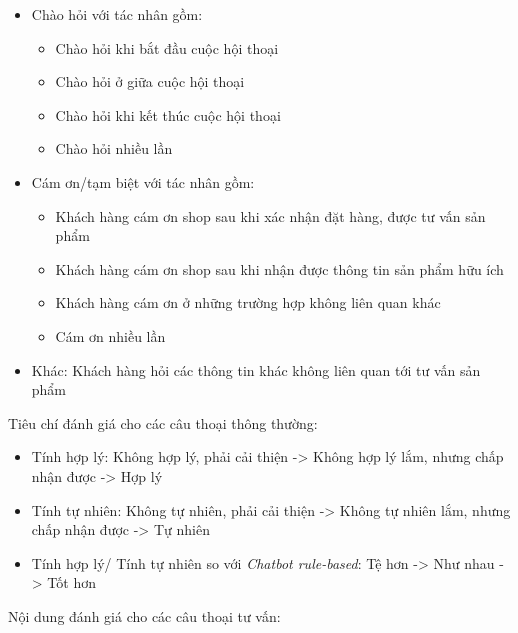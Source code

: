 \begin{itemize}
    \item Chào hỏi với tác nhân gồm:
    \begin{itemize}
        \item Chào hỏi khi bắt đầu cuộc hội thoại
        \item Chào hỏi ở giữa cuộc hội thoại
        \item Chào hỏi khi kết thúc cuộc hội thoại
        \item Chào hỏi nhiều lần
    \end{itemize}
    \item Cám ơn/tạm biệt với tác nhân gồm:
    \begin{itemize}
        \item Khách hàng cám ơn shop sau khi xác nhận đặt hàng, được
        tư vấn sản phẩm
        \item Khách hàng cám ơn shop sau khi nhận được thông tin
        sản phẩm hữu ích
        \item Khách hàng cám ơn ở những trường hợp không liên quan khác
        \item Cám ơn nhiều lần
    \end{itemize}
    \item Khác: Khách hàng hỏi các thông tin khác không liên quan tới
    tư vấn sản phẩm
\end{itemize}

Tiêu chí đánh giá cho các câu thoại thông thường:

\begin{itemize}
    \item Tính hợp lý: Không hợp lý, phải cải thiện -> Không hợp lý
    lắm, nhưng chấp nhận được -> Hợp lý
    \item Tính tự nhiên: Không tự nhiên, phải cải thiện -> Không
    tự nhiên lắm, nhưng chấp nhận được -> Tự nhiên
    \item Tính hợp lý/ Tính tự nhiên so với \textit{Chatbot rule-based}:
    Tệ hơn -> Như nhau -> Tốt hơn
\end{itemize}

Nội dung đánh giá cho các câu thoại tư vấn:


